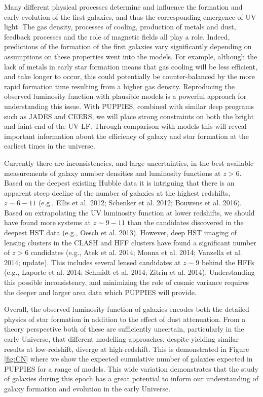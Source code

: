 \documentclass[12pt]{article}
\begin{document}
Many different physical processes determine and influence the formation and early evolution of the first galaxies, and thus the corresponding emergence of UV light. The gas density, processes of cooling, production of metals and dust, feedback processes and the role of magnetic fields all play a role. Indeed, predictions of the formation of the first galaxies vary significantly depending on assumptions on these properties went into the models. For example, although the lack of metals in early star formation means that gas cooling will be less efficient, and take longer to occur, this could potentially be counter-balanced by the more rapid formation time resulting from a higher gas density. Reproducing the observed luminosity function with plausible models is a powerful approach for understanding this issue. With PUPPIES, combined with similar deep programs such as JADES and CEERS, we will place strong constraints on both the bright and faint-end of the UV LF. Through comparison with models this will reveal important information about the efficiency of galaxy and star formation at the earliest times in the universe.
 
Currently there are inconsistencies, and large uncertainties, in the best available measurements of galaxy number densities and luminosity functions at $z > 6$.  Based on the deepest existing Hubble data it is intriguing that there is an apparent steep decline of the number of galaxies at the highest redshifts, $z \sim 6-11$ (e.g., Ellis et al. 2012; Schenker et al. 2012; Bouwens et al. 2016). Based on extrapolating the UV luminosity function at lower redshifts, we should have found more systems at $z \sim 9-11$ than the candidates discovered in the deepest HST data (e.g., Oesch et al. 2013).  However, deep HST imaging of lensing clusters in the CLASH and HFF clusters have found a significant number of $z>6$ candidates (e.g., Atek et al. 2014; Monna et al. 2014; Vanzella et al. 2014; update).  This includes several lensed candidates at $z\sim 9$ behind the HFFs (e.g., Laporte et al. 2014; Schmidt et al. 2014; Zitrin et al. 2014).   Understanding this possible inconsistency, and minimizing the role of cosmic variance requires the deeper and larger area data which PUPPIES will provide.

Overall, the observed luminosity function of galaxies encodes both the  detailed physics of star formation in addition to the effect of dust attenuation. From a theory perspective both of these are sufficiently uncertain, particularly in the early Universe, that different modelling approaches, despite yielding similar results at low-redshift, diverge at high-redshift. This is demonstrated in Figure \ref{fig:CN} where we show the expected cumulative number of galaxies expected in PUPPIES for a range of models. This wide variation demonstrates that the study of galaxies during this epoch has a great potential to inform our understanding of galaxy formation and evolution in the early Universe.
\end{document}
